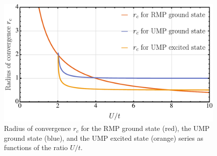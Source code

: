 \documentclass[aps,prb,reprint,noshowkeys,superscriptaddress]{revtex4-1}
\begin{document}
\begin{figure}[htb]
	\includegraphics[width=\linewidth]{fig5}
	\caption{
	Radius of convergence $r_c$ for the RMP ground state (red), the UMP ground state (blue), and the UMP excited state (orange) 
    series as functions of the ratio $U/t$.
	\label{fig:RadConv}}
\end{figure}
\end{document}
